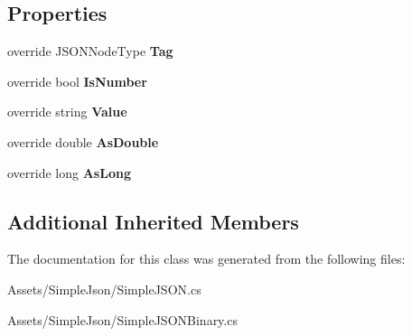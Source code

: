 \subsection*{Properties}
\begin{DoxyCompactItemize}
\item 
override J\+S\+O\+N\+Node\+Type {\bfseries Tag}\hypertarget{classSimpleJSON_1_1JSONNumber_a29c1abafa84af51980adc6e9be6537c2}{}\label{classSimpleJSON_1_1JSONNumber_a29c1abafa84af51980adc6e9be6537c2}

\item 
override bool {\bfseries Is\+Number}\hypertarget{classSimpleJSON_1_1JSONNumber_a8e9db9a63b45de658be33bcea65d4d38}{}\label{classSimpleJSON_1_1JSONNumber_a8e9db9a63b45de658be33bcea65d4d38}

\item 
override string {\bfseries Value}\hypertarget{classSimpleJSON_1_1JSONNumber_ab2c6d4bc845d929be0a1150df3075d6c}{}\label{classSimpleJSON_1_1JSONNumber_ab2c6d4bc845d929be0a1150df3075d6c}

\item 
override double {\bfseries As\+Double}\hypertarget{classSimpleJSON_1_1JSONNumber_a735e0ab9bbc1ef27878424211db77a9d}{}\label{classSimpleJSON_1_1JSONNumber_a735e0ab9bbc1ef27878424211db77a9d}

\item 
override long {\bfseries As\+Long}\hypertarget{classSimpleJSON_1_1JSONNumber_a2428653325dda129c8fcdfd77f5be662}{}\label{classSimpleJSON_1_1JSONNumber_a2428653325dda129c8fcdfd77f5be662}

\end{DoxyCompactItemize}
\subsection*{Additional Inherited Members}


The documentation for this class was generated from the following files\+:\begin{DoxyCompactItemize}
\item 
Assets/\+Simple\+Json/Simple\+J\+S\+O\+N.\+cs\item 
Assets/\+Simple\+Json/Simple\+J\+S\+O\+N\+Binary.\+cs\end{DoxyCompactItemize}
